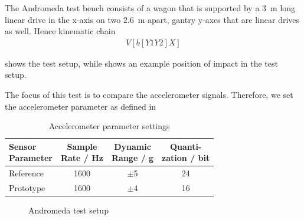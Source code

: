 The Andromeda test bench consists of a wagon that is supported by a \SI{3}{\meter} long linear drive in the x-axis on two \SI{2.6}{\meter} apart, gantry y-axes that are linear drives as well. Hence kinematic chain
\begin{align*}
  V[b [Y1 Y2] X]
\end{align*}

 shows the test setup, while  shows an example position of impact in the test setup.

The focus of this test is to compare the accelerometer signals. Therefore, we set the accelerometer parameter as defined in 

\begin{table}[!htb]
\centering
\def\coltitle#1{\multicolumn{1}{c}{#1}}
  {\renewcommand{\arraystretch}{1.5}%
  \footnotesize
  \begin{tabular}{lccc}
    \toprule
    \makecell{Sensor\\Parameter} &
    \makecell{Sample\\Rate / \si{Hz}} &
    \makecell{Dynamic\\Range / \si{g}} & \makecell{Quanti-\\zation / \si{bit}}\\
    \midrule
    Reference & 1600 & $\pm$5 & 24\\
    Prototype & 1600 & $\pm$4 & 16\\
    \bottomrule
  \end{tabular}
  \normalsize
  }
  \caption[Set Accelerometer Parameters]{Accelerometer parameter settings%
    \label{tab:set_acc_par}}
\end{table}

\begin{figure}[!htb]
  \centering
    \hspace{4em}
  \caption[Andromeda Test Setup]{Andromeda test setup%
    \label{fig:andromeda_pics}}
\end{figure}

